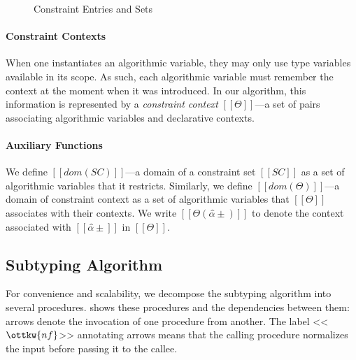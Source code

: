   \begin{figure}[h]
    \begin{multicols}{2}

    \columnbreak

    \end{multicols}

    \label{fig:syntax-e-sc}
    \caption{Constraint Entries and Sets}
  \end{figure}

\paragraph{Constraint Contexts}
When one instantiates an algorithmic variable, 
they may only use type variables available in its scope.
As such, each algorithmic variable must remember the context at the moment when 
it was introduced. In our algorithm, this information is represented by
a \emph{constraint context} $[[Θ]]$---a set of pairs associating 
algorithmic variables and declarative contexts.

\paragraph{Auxiliary Functions}
We define $[[dom(SC)]]$---a domain of a constraint set $[[SC]]$ as a set of algorithmic variables
that it restricts. Similarly, we define $[[dom(Θ)]]$---a domain of constraint context
as a set of algorithmic variables that $[[Θ]]$ associates with their contexts.
We write $[[Θ(α̂±)]]$ to denote the context associated with $[[α̂±]]$ in $[[Θ]]$.



\subsection{Subtyping Algorithm}
\label{sec:subtyping-algorithm}
  
  For convenience and scalability, 
  we decompose the subtyping algorithm 
  into several procedures. 
  shows these procedures and the dependencies between them:
  arrows denote the invocation of one procedure from another.
  The label <<$\ottkw{nf}$>> annotating arrows means that the calling
  procedure normalizes the input before passing it to the callee.

